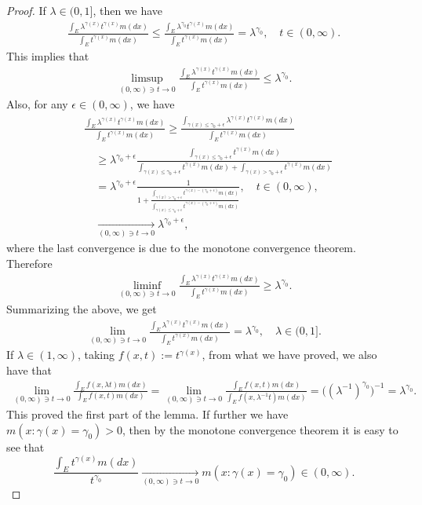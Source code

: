 \documentclass[UTF8]{pkuthss}
\theoremstyle{plain}
\theoremstyle{definition}
\numberwithin{equation}{section}
\begin{document}
\begin{proof}
	If $\lambda \in (0,1]$, then we have
\begin{align}
	\frac{\int_E \lambda^{\gamma(x)} t^{\gamma(x)} m(dx)}{\int_E t^{\gamma(x)} m(dx)}
	\leq \frac{\int_E \lambda^{\gamma_0} t^{\gamma(x)} m(dx)}{\int_E t^{\gamma(x)} m(dx)}
	= \lambda^{\gamma_0},
	\quad t\in (0,\infty).
\end{align}
	This implies that
\begin{align}
	\limsup_{(0,\infty) \ni t\to 0}\frac{\int_E \lambda^{\gamma(x)} t^{\gamma(x)} m(dx)}{\int_E t^{\gamma(x)} m(dx)}	
	\leq \lambda ^{\gamma_0}.
\end{align}
	Also, for any $\epsilon \in (0,\infty)$, we have
\begin{align}
	&\frac{\int_E \lambda^{\gamma(x)} t^{\gamma(x)} m(dx)}{\int_E t^{\gamma(x)} m(dx)}
	\geq \frac{ \int_{ \gamma(x) \leq  \gamma_0 + \epsilon } \lambda^{ \gamma(x) } t^{ \gamma(x)} m(dx) } { \int_E t^{ \gamma(x) } m(dx) }
	\\&\quad \geq \lambda^{ \gamma_0 + \epsilon} \frac{ \int_{ \gamma(x) \leq \gamma_0 + \epsilon } t^{ \gamma(x)} m(dx) } { \int_{ \gamma(x) \leq \gamma_0 + \epsilon}t^{\gamma(x)}m(dx)+ \int_{\gamma(x) > \gamma_0 + \epsilon} t^{\gamma(x)}m(dx)}
	\\&\quad = \lambda^{\gamma_0 + \epsilon} \frac{1}{1+ \frac{\int_{\gamma(x) > \gamma_0 + \epsilon}t^{\gamma(x) - (\gamma_0 + \epsilon)}m(dx)}{\int_{\gamma(x) \leq \gamma_0 + \epsilon}t^{\gamma(x)- (\gamma_0 + \epsilon)}m(dx)}},
	\quad t\in (0, \infty),
	\\&\quad \xrightarrow[(0,\infty) \ni t\to 0]{}
	\lambda ^{\gamma_0 + \epsilon},
\end{align}
	where the last convergence is due to the monotone convergence theorem.
	Therefore
\begin{align}
	\liminf_{(0,\infty) \ni t\to 0}\frac{\int_E \lambda^{\gamma(x)} t^{\gamma(x)} m(dx)}{\int_E t^{\gamma(x)} m(dx)}
	\geq \lambda ^{\gamma_0}.
\end{align}
	Summarizing the above,  we get
\begin{align}
	\lim_{(0,\infty) \ni t\to 0}\frac{\int_E \lambda^{\gamma(x)} t^{\gamma(x)} m(dx)}{\int_E t^{\gamma(x)} m(dx)}
	= \lambda ^{\gamma_0},	
	\quad \lambda \in (0,1].
\end{align}
	If $\lambda \in (1,\infty)$, taking $f(x, t):= t^{\gamma(x)}$, from what we have proved, we also have that
\begin{align}
	\lim_{(0,\infty)\ni t\to 0}\frac{\int_E f(x,\lambda t)m(dx)}{\int_E f(x, t)m(dx)}
	= \lim_{(0,\infty)\ni t\to 0}\frac{\int_E f(x,t)m(dx)}{\int_E f(x, \lambda^{-1} t)m(dx)}
	= \big((\lambda^{-1})^{\gamma_0} \big)^{-1}
	= \lambda ^{\gamma_0}.
\end{align}
	This proved the first part of the lemma.
	If further we have $m(x:\gamma(x) = \gamma_0)>0$,
	then by the monotone convergence theorem  it is easy to see that
\begin{equation}
	\frac{\int_E t^{\gamma(x)} m(dx)}{t^{\gamma_0}}
	\xrightarrow[(0,\infty)\ni t\to 0]{} m(x:\gamma(x) = \gamma_0)\in (0,\infty).
\end{equation}
\end{proof}
\end{document}
